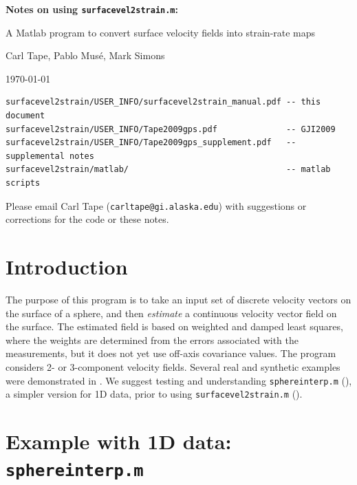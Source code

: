 \documentclass[11pt,titlepage,fleqn]{article}
\begin{document}

\begin{spacing}{1.5}
\begin{center}
{\large \bf Notes on using {\tt surfacevel2strain.m}:

A Matlab program to convert surface velocity fields into strain-rate maps}
\end{center}
\end{spacing}

\bigskip
\noindent Carl Tape, Pablo Mus\'e, Mark Simons

\noindent \today

\small

\begin{verbatim}
surfacevel2strain/USER_INFO/surfacevel2strain_manual.pdf -- this document
surfacevel2strain/USER_INFO/Tape2009gps.pdf              -- GJI2009 
surfacevel2strain/USER_INFO/Tape2009gps_supplement.pdf   -- supplemental notes
surfacevel2strain/matlab/                                -- matlab scripts
\end{verbatim}

\noindent
Please email Carl Tape ({\tt carltape@gi.alaska.edu}) with suggestions or corrections for the code or these notes.

\tableofcontents


\section{Introduction}

The purpose of this program is to take an input set of discrete velocity vectors on the surface of a sphere, and then {\em estimate} a continuous velocity vector field on the surface. The estimated field is based on weighted and damped least squares, where the weights are determined from the errors associated with the measurements, but it does not yet use off-axis covariance values.  The program considers 2- or 3-component velocity fields. Several real and synthetic examples were demonstrated in \citet{Tape2009gps}. We suggest testing and understanding \verb+sphereinterp.m+ (), a simpler version for 1D data, prior to using \verb+surfacevel2strain.m+ ().


\section{Example with 1D data: {\tt sphereinterp.m}}
\label{sec:sphereinterp}
\end{document}
